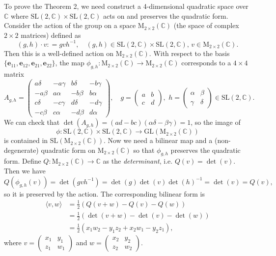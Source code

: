 \documentclass{article}
\newcommand{\SL}{\mathrm{SL}}
\newcommand{\GL}{\mathrm{GL}}
\newcommand{\Ma}{\mathrm{M}}
\begin{document}
To prove the Theorem 2, we need construct a 4-dimensional quadratic space over $\mathbb{C}$ where $\SL(2, \mathbb{C}) \times \SL(2, \mathbb{C})$ acts on and preserves the quadratic form.
Consider the action of the group on a space $\Ma_{2\times 2}(\mathbb{C})$ (the space of complex $2\times 2$ matrices) defined as 
$$
(g, h)\cdot v: = gvh^{-1}, \quad (g, h)\in \SL(2, \mathbb{C})\times\SL(2, \mathbb{C}), \, v\in \Ma_{2\times 2}(\mathbb{C}). 
$$
Then this is a well-defined action on $\Ma_{2\times 2}(\mathbb{C})$. With respect to the basis $\{\mathbf{e}_{11}, \mathbf{e}_{12}, \mathbf{e}_{21}, \mathbf{e}_{22}\}$, the map $\phi_{g, h}:\Ma_{2\times 2}(\mathbb{C})\to \Ma_{2\times 2}(\mathbb{C})$ corresponds to a $4\times 4$ matrix
$$
A_{g, h}=
\begin{pmatrix}
a\delta & -a\gamma & b\delta & -b\gamma \\
-a\beta & a\alpha & -b\beta & b\alpha \\
c\delta & -c\gamma & d\delta & -d\gamma \\
-c\beta & c\alpha & -d\beta & d\alpha
\end{pmatrix}, \quad g = \begin{pmatrix} a&b\\c&d \end{pmatrix} , \,\, h = \begin{pmatrix} \alpha&\beta \\ \gamma & \delta\end{pmatrix} \in \SL(2, \mathbb{C}).
$$
We can check that $\det(A_{g, h}) = (ad-bc)(\alpha\delta - \beta\gamma) = 1$, so the image of $$\phi:\SL(2, \mathbb{C})\times\SL(2, \mathbb{C})\to \GL(\Ma_{2\times 2}(\mathbb{C}))$$ is contained in $\SL(\Ma_{2\times 2}(\mathbb{C}))$. 
Now we need a bilinear map and a (non-degenerate) quadratic form on $\Ma_{2\times 2}(\mathbb{C})$ so that $\phi_{g, h}$ preserves the quadratic form. 
Define $Q:\Ma_{2\times 2}(\mathbb{C})\to \mathbb{C}$ as the \emph{determinant}, i.e. $Q(v) = \det(v)$. 
Then we have $$Q(\phi_{g, h}(v)) = \det(gvh^{-1}) = \det(g)\det(v)\det(h)^{-1} = \det(v) = Q(v),$$ so it is preserved by the action. 
The corresponding bilinear form is
\begin{align*}
    \langle v, w\rangle &= \frac{1}{2}\left( Q(v+w)-Q(v)-Q(w)\right) \\
    &= \frac{1}{2}(\det(v+w) - \det(v) - \det(w)) \\
    &= \frac{1}{2}(x_{1}w_{2} - y_{1}z_{2} + x_{2}w_{1}- y_{2}z_{1}),
\end{align*}
where $v = \left(\begin{smallmatrix} x_1 & y_1 \\ z_1 & w_1 \end{smallmatrix}\right)$ and $w = \left(\begin{smallmatrix} x_2 & y_2 \\ z_2 & w_2 \end{smallmatrix}\right)$.
\end{document}
